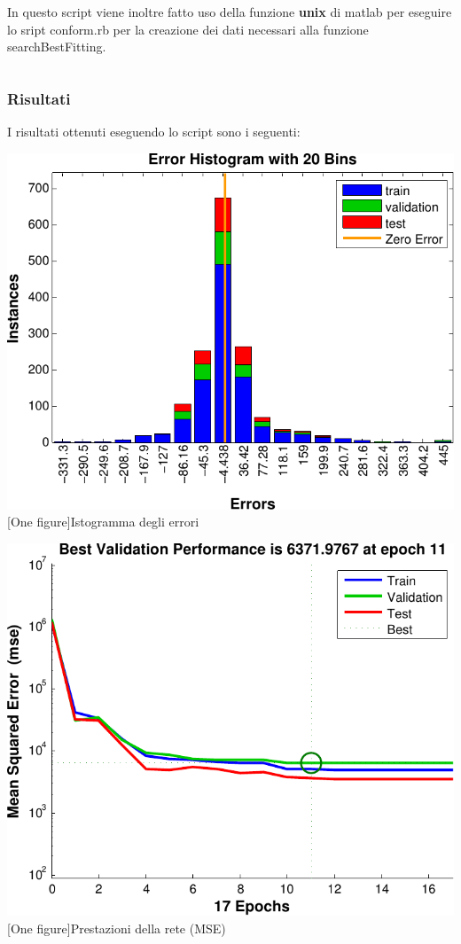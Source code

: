 In questo script viene inoltre fatto uso della funzione {\bf unix} di matlab per eseguire lo sript conform.rb per la creazione dei dati necessari alla funzione searchBestFitting.

\inputminted[linenos=true,fontsize=\footnotesize]{matlab}{../../src/netfit.m}


\subsubsection{Risultati}
I risultati ottenuti eseguendo lo script sono i seguenti:\\
\vspace{20px}

\includegraphics[scale=0.7]{images/neural_net/histogram.pdf}
[One figure]{Istogramma degli errori}
\vspace{20px}

\includegraphics[scale=0.7]{images/neural_net/performances.pdf}
[One figure]{Prestazioni della rete (MSE)}
\vspace{20px}

